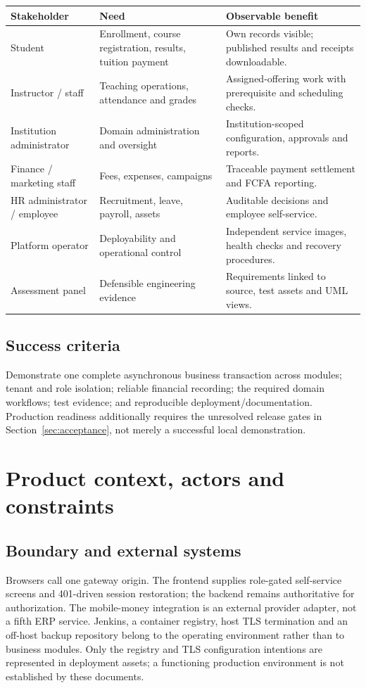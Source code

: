 \documentclass[10pt,a4paper]{article}
\begin{document}
\begin{tabularx}{\textwidth}{@{}L{35mm}Y Y@{}}
\toprule Stakeholder & Need & Observable benefit\\\midrule
Student & Enrollment, course registration, results, tuition payment & Own records visible; published results and receipts downloadable.\\
Instructor / staff & Teaching operations, attendance and grades & Assigned-offering work with prerequisite and scheduling checks.\\
Institution administrator & Domain administration and oversight & Institution-scoped configuration, approvals and reports.\\
Finance / marketing staff & Fees, expenses, campaigns & Traceable payment settlement and FCFA reporting.\\
HR administrator / employee & Recruitment, leave, payroll, assets & Auditable decisions and employee self-service.\\
Platform operator & Deployability and operational control & Independent service images, health checks and recovery procedures.\\
Assessment panel & Defensible engineering evidence & Requirements linked to source, test assets and UML views.\\
\bottomrule
\end{tabularx}
\subsection{Success criteria}
Demonstrate one complete asynchronous business transaction across modules;
tenant and role isolation; reliable financial recording; the required domain
workflows; test evidence; and reproducible deployment/documentation.
Production readiness additionally requires the unresolved release gates in
Section~\ref{sec:acceptance}, not merely a successful local demonstration.

\clearpage
\section{Product context, actors and constraints}
\subsection{Boundary and external systems}
Browsers call one gateway origin. The frontend supplies role-gated self-service screens and
401-driven session restoration; the backend remains authoritative for authorization.
The mobile-money integration is an external provider adapter, not a fifth ERP
service. Jenkins, a container registry, host TLS termination and an off-host backup
repository belong to the operating environment rather than to business modules.
Only the registry and TLS configuration intentions are represented in deployment
assets; a functioning production environment is not established by these documents.
\end{document}

